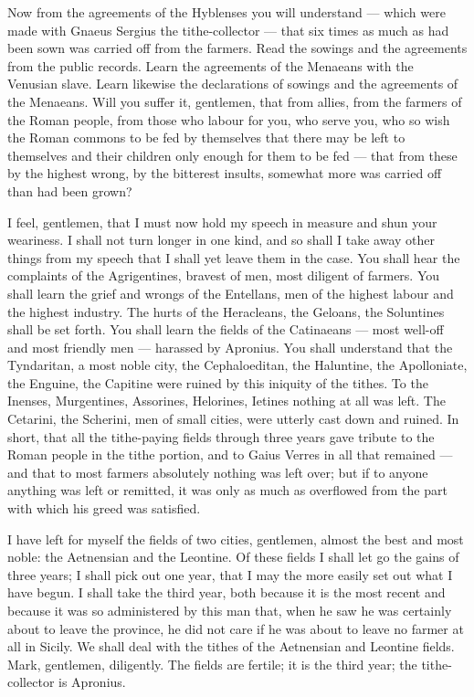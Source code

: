  Now from the agreements of the Hyblenses you will understand --- which were made with Gnaeus Sergius the tithe-collector --- that six times as much as had been sown was carried off from the farmers. Read the sowings and the agreements from the public records. Learn the agreements of the Menaeans with the Venusian slave. Learn likewise the declarations of sowings and the agreements of the Menaeans. Will you suffer it, gentlemen, that from allies, from the farmers of the Roman people, from those who labour for you, who serve you, who so wish the Roman commons to be fed by themselves that there may be left to themselves and their children only enough for them to be fed --- that from these by the highest wrong, by the bitterest insults, somewhat more was carried off than had been grown?

 I feel, gentlemen, that I must now hold my speech in measure and shun your weariness. I shall not turn longer in one kind, and so shall I take away other things from my speech that I shall yet leave them in the case. You shall hear the complaints of the Agrigentines, bravest of men, most diligent of farmers. You shall learn the grief and wrongs of the Entellans, men of the highest labour and the highest industry. The hurts of the Heracleans, the Geloans, the Soluntines shall be set forth. You shall learn the fields of the Catinaeans --- most well-off and most friendly men --- harassed by Apronius. You shall understand that the Tyndaritan, a most noble city, the Cephaloeditan, the Haluntine, the Apolloniate, the Enguine, the Capitine were ruined by this iniquity of the tithes. To the Inenses, Murgentines, Assorines, Helorines, Ietines nothing at all was left. The Cetarini, the Scherini, men of small cities, were utterly cast down and ruined. In short, that all the tithe-paying fields through three years gave tribute to the Roman people in the tithe portion, and to Gaius Verres in all that remained --- and that to most farmers absolutely nothing was left over; but if to anyone anything was left or remitted, it was only as much as overflowed from the part with which his greed was satisfied.

 I have left for myself the fields of two cities, gentlemen, almost the best and most noble: the Aetnensian and the Leontine. Of these fields I shall let go the gains of three years; I shall pick out one year, that I may the more easily set out what I have begun. I shall take the third year, both because it is the most recent and because it was so administered by this man that, when he saw he was certainly about to leave the province, he did not care if he was about to leave no farmer at all in Sicily. We shall deal with the tithes of the Aetnensian and Leontine fields. Mark, gentlemen, diligently. The fields are fertile; it is the third year; the tithe-collector is Apronius.

